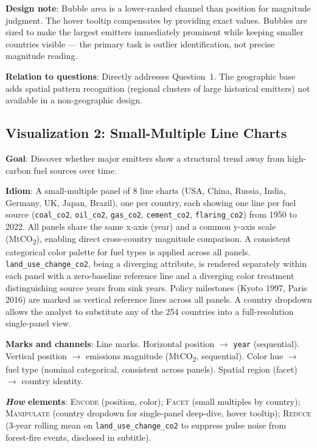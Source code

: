 \documentclass[10pt]{article}
\begin{document}
\textbf{Design note}: Bubble area is a lower-ranked channel than position for magnitude judgment. The hover tooltip compensates by providing exact values. Bubbles are sized to make the largest emitters immediately prominent while keeping smaller countries visible --- the primary task is outlier identification, not precise magnitude reading.

\textbf{Relation to questions}: Directly addresses Question~1. The geographic base adds spatial pattern recognition (regional clusters of large historical emitters) not available in a non-geographic design.

\subsection{Visualization 2: Small-Multiple Line Charts}

\textbf{Goal}: Discover whether major emitters show a structural trend away from high-carbon fuel sources over time.

\textbf{Idiom}: A small-multiple panel of 8 line charts (USA, China, Russia, India, Germany, UK, Japan, Brazil), one per country, each showing one line per fuel source (\texttt{coal\_co2}, \texttt{oil\_co2}, \texttt{gas\_co2}, \texttt{cement\_co2}, \texttt{flaring\_co2}) from 1950 to 2022. All panels share the same x-axis (year) and a common y-axis scale (MtCO\textsubscript{2}), enabling direct cross-country magnitude comparison. A consistent categorical color palette for fuel types is applied across all panels. \texttt{land\_use\_change\_co2}, being a diverging attribute, is rendered separately within each panel with a zero-baseline reference line and a diverging color treatment distinguishing source years from sink years. Policy milestones (Kyoto 1997, Paris 2016) are marked as vertical reference lines across all panels. A country dropdown allows the analyst to substitute any of the 254 countries into a full-resolution single-panel view.

\textbf{Marks and channels}: Line marks. Horizontal position $\rightarrow$ \texttt{year} (sequential). Vertical position $\rightarrow$ emissions magnitude (MtCO\textsubscript{2}, sequential). Color hue $\rightarrow$ fuel type (nominal categorical, consistent across panels). Spatial region (facet) $\rightarrow$ country identity.

\textbf{\emph{How} elements}: \textsc{Encode} (position, color); \textsc{Facet} (small multiples by country); \textsc{Manipulate} (country dropdown for single-panel deep-dive, hover tooltip); \textsc{Reduce} (3-year rolling mean on \texttt{land\_use\_change\_co2} to suppress pulse noise from forest-fire events, disclosed in subtitle).
\end{document}
